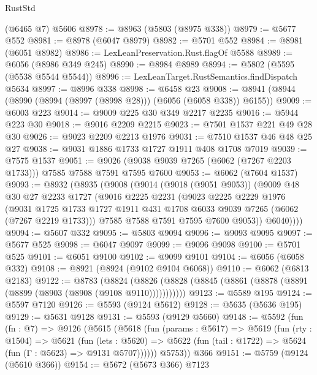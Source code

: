 \begin{lexlean}{RustStd}
\begin{coremodule}
    (@6465 @7)
    @5606
@8978 := @8963 (@5803 (@8975 @338))
@8979 := @5677 @552
@8981 := @8978 (@6047 @8979)
@8982 := @5701 @552
@8984 := @8981 (@6051 @8982)
@8986 := LexLeanPreservation.Rust.flagOf @5588
@8989 := @6056 (@8986 @349 @245)
@8990 := @8984 @8989
@8994 := @5802 (@5595 (@5538 @5544 @5544))
@8996 := LexLeanTarget.RustSemantics.findDispatch @5634
@8997 := @8996 @338
@8998 := @6458 @23
@9008 := @8941 (@8944 (@8990 (@8994 (@8997 (@8998 @28))) (@6056 (@6058 @338)) @6155))
@9009 := @6003 @223
@9014 := @9009 @225 @30 @349 @2217 @2235
@9016 := @5944 @223 @30
@9018 := @9016 @2209 @2215
@9023 := @7501 @1537 @221 @49 @28 @30
@9026 := @9023 @2209 @2213 @1976
@9031 := @7510 @1537 @46 @48 @25 @27
@9038 := @9031 @1886 @1733 @1727 @1911 @408 @1708 @7019
@9039 := @7575 @1537
@9051 := @9026 (@9038 @9039 @7265 (@6062 (@7267 @2203 @1733))) @7585 @7588 @7591 @7595 @7600
@9053 := @6062 (@7604 @1537)
@9093 := @8932
    (@8935
      (@9008
        (@9014
          (@9018 (@9051 @9053))
          (@9009
            @48
            @30
            @27
            @2233
            @1727
            (@9016
              @2225
              @2231
              (@9023
                @2225
                @2229
                @1976
                (@9031
                  @1725
                  @1733
                  @1727
                  @1911
                  @431
                  @1708
                  @6033
                  @9039
                  @7265
                  (@6062 (@7267 @2219 @1733)))
                @7585
                @7588
                @7591
                @7595
                @7600
                @9053))
            @6040))))
@9094 := @5607 @332
@9095 := @5803 @9094
@9096 := @9093 @9095
@9097 := @5677 @525
@9098 := @6047 @9097
@9099 := @9096 @9098
@9100 := @5701 @525
@9101 := @6051 @9100
@9102 := @9099 @9101
@9104 := @6056 (@6058 @332)
@9108 := @8921 (@8924 (@9102 @9104 @6068))
@9110 := @6062 (@6813 @2183)
@9122 := @8783
    (@8824 (@8826 (@8828 (@8845 (@8861 (@8878 (@8891 (@8899 (@8903 (@8908 (@9108 @9110)))))))))))
@9123 := @5589 @195
@9124 := @5597 @7120
@9126 := @5593 (@9124 @5612)
@9128 := @5635 (@5636 @195)
@9129 := @5631 @9128
@9131 := @5593 (@9129 @5660)
@9148 := @5592
    (fun (fn : @7) =>
    @9126
      (@5615
        (@5618
          (fun (params : @5617) =>
          @5619
            (fun (rty : @1504) =>
            @5621
              (fun (lets : @5620) =>
              @5622 (fun (tail : @1722) => @5624 (fun (Γ : @5623) => @9131 @5707))))))
        @5753))
    @366
@9151 := @5759 (@9124 (@5610 @366))
@9154 := @5672 (@5673 @366) @7123

\end{coremodule}
\end{lexlean}
